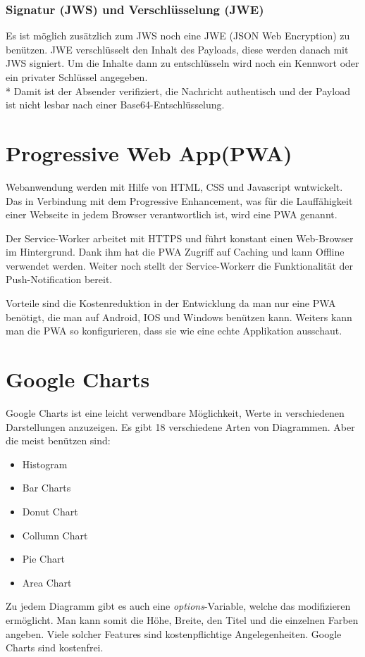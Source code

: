 \subsubsection{Signatur (JWS) und Verschlüsselung (JWE)}
Es ist möglich zusätzlich zum JWS noch eine JWE (JSON Web Encryption) zu benützen. JWE verschlüsselt den Inhalt des Payloads, diese werden danach mit JWS signiert.
Um die Inhalte dann zu entschlüsseln wird noch ein Kennwort oder ein privater Schlüssel angegeben. \\*
Damit ist der Absender verifiziert, die Nachricht authentisch und der Payload ist nicht lesbar nach einer Base64-Entschlüsselung. \cite{JWTIONOS}


\section{Progressive Web App(PWA)}
Webanwendung werden mit Hilfe von HTML, CSS und Javascript wntwickelt. 
Das in Verbindung mit dem Progressive Enhancement, was für die Lauffähigkeit einer Webseite in jedem Browser verantwortlich ist, wird eine PWA genannt. 

Der Service-Worker arbeitet mit HTTPS und führt konstant einen Web-Browser im Hintergrund.
Dank ihm hat die PWA Zugriff auf Caching und kann Offline verwendet werden. 
Weiter noch stellt der Service-Workerr die Funktionalität der Push-Notification bereit.  


Vorteile sind die Kostenreduktion in der Entwicklung da man nur eine PWA benötigt, die man auf Android, IOS und Windows benützen kann.
Weiters kann man die PWA so konfigurieren, dass sie wie eine echte Applikation ausschaut.


\section{Google Charts}
\cite{Google-Charts}
Google Charts ist eine leicht verwendbare Möglichkeit, Werte in verschiedenen Darstellungen anzuzeigen.
Es gibt 18 verschiedene Arten von Diagrammen. Aber die meist benützen sind:

\begin{itemize}
    \item Histogram
    \item Bar Charts
    \item Donut Chart
    \item Collumn Chart
    \item Pie Chart
    \item Area Chart
\end{itemize}
Zu jedem Diagramm gibt es auch eine \textit{options}-Variable, welche das modifizieren ermöglicht.
Man kann somit die Höhe, Breite, den Titel und die einzelnen Farben angeben.
\linebreak
Viele solcher Features sind kostenpflichtige Angelegenheiten. Google Charts sind kostenfrei.

